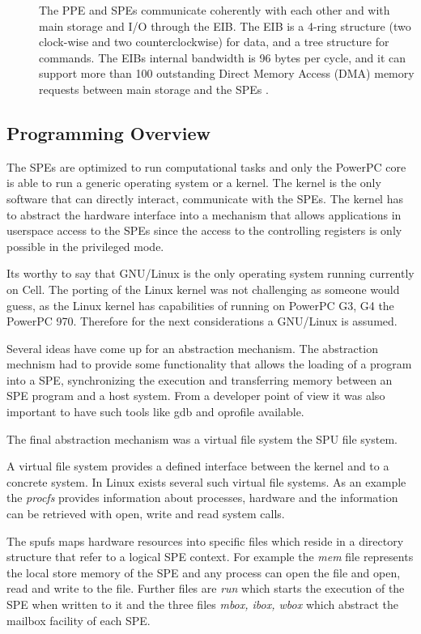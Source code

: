 \documentclass[DIV10, abstracton, openright, footsepline, headsepline, twoside, 9pt,
bigheadings]{scrreprt}
\begin{document}
\begin{description}
\item[\color{Bigblue}{Element Interconnect Bus (EIB)}]
The PPE and SPEs communicate coherently with each other and with main storage
and I/O through the EIB. The EIB is a 4-ring structure (two clock-wise and
two counterclockwise) for data, and a tree structure for commands. The EIBs
internal bandwidth is 96 bytes per cycle, and it can support more than 100
outstanding Direct Memory Access (DMA) memory requests between main storage and the SPEs
\cite{IBMhb06}.
\end{description}

\subsection{Programming Overview}

The SPEs are optimized to run computational tasks and only the PowerPC core is
able to run a generic operating system or a kernel. The kernel is
the only software that can directly interact, communicate with the
SPEs. The kernel has to abstract the hardware interface into a mechanism that
allows applications in userspace access to the SPEs since the access to the
controlling registers is only possible in the privileged mode.

Its worthy to say that GNU/Linux is the only operating system running
currently on Cell. The porting of the Linux kernel was not challenging as
someone would guess, as the Linux kernel has capabilities of running on PowerPC
G3, G4 the PowerPC 970. Therefore for the next considerations a GNU/Linux is
assumed.

Several ideas have come up for an abstraction mechanism. The abstraction
mechnism had to provide some functionality that allows the loading of a program
into a SPE, synchronizing the execution and transferring memory between
an SPE program and a host system. From a developer point of view it was also
important to have such tools like gdb and oprofile available.

The final abstraction mechanism was a virtual file system the SPU file system.

A virtual file system provides a defined interface between the kernel and to a
concrete system. In Linux exists several such virtual file systems. As an
example the \textit{procfs} provides information about processes, hardware and
the information can be retrieved with open, write and read system calls.

The spufs maps hardware resources into specific files which reside in a
directory structure that refer to a logical SPE context. For example the
\textit{mem} file represents the local store memory of the SPE and any process
can open the file and open, read and write to the file. Further files are
\textit{run} which starts the execution of the SPE when written to it and the
three files \textit{mbox, ibox, wbox} which abstract the mailbox facility of
each SPE.
\end{document}
